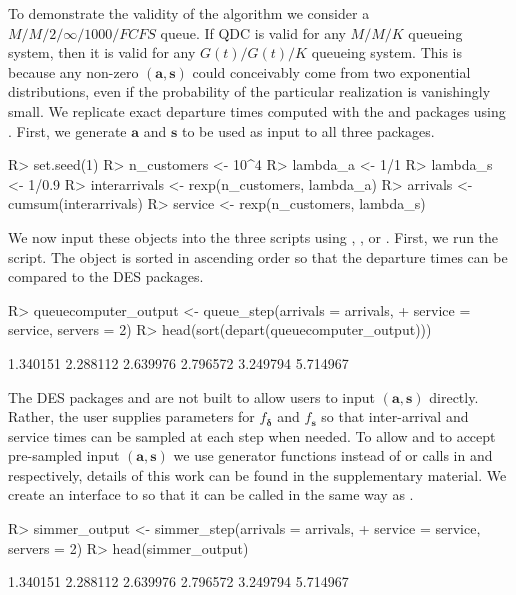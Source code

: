 \documentclass[article]{jss}
\begin{document}
To demonstrate the validity of the algorithm we consider a
$M/M/2/\infty/1000/\mathit{FCFS}$ queue. If QDC is valid for any
$M/M/K$ queueing system, then it is valid for any $G(t)/G(t)/K$
queueing system. This is because any non-zero $\mathbf{(a,s)}$ could
conceivably come from two exponential distributions, even if the
probability of the particular realization is vanishingly small. We
replicate exact departure times computed with the  and
 packages using . First, we generate
$\mathbf{a}$ and $\mathbf{s}$ to be used as input to all three
packages.
%
\begin{CodeChunk}
\begin{CodeInput}
R> set.seed(1)
R> n_customers <- 10^4
R> lambda_a <- 1/1
R> lambda_s <- 1/0.9
R> interarrivals <- rexp(n_customers, lambda_a)
R> arrivals <- cumsum(interarrivals)
R> service <- rexp(n_customers, lambda_s)
\end{CodeInput}  
\end{CodeChunk}
%
We now input these objects into the three scripts using , , or . First, we run the  script. The  object is sorted in ascending order so that the departure times can be compared to the DES packages.
%
\begin{CodeChunk}
\begin{Sinput}
R> queuecomputer_output <- queue_step(arrivals = arrivals, 
+    service = service, servers = 2)
R> head(sort(depart(queuecomputer_output)))
\end{Sinput}
\begin{Soutput}
[1] 1.340151 2.288112 2.639976 2.796572 3.249794 5.714967
\end{Soutput}
\end{CodeChunk}
%
The DES packages  and  are not built to allow
users to input $(\mathbf{a,s})$ directly. Rather, the user supplies
parameters for $f_{\boldsymbol{\delta}}$ and $f_{\mathbf{s}}$ so that inter-arrival
and service times can be sampled at each step when needed. To allow
 and  to accept pre-sampled input
$(\mathbf{a,s})$ we use generator functions instead of
 or  calls in
 and  respectively, details of this work
can be found in the supplementary material. We create an interface to
 so that it can be called in the same way as
.
%
\begin{CodeChunk}
\begin{Sinput}
R> simmer_output <- simmer_step(arrivals = arrivals, 
+    service = service, servers = 2)
R> head(simmer_output)
\end{Sinput}
\begin{Soutput}
[1] 1.340151 2.288112 2.639976 2.796572 3.249794 5.714967
\end{Soutput}
\end{CodeChunk}
\end{document}
